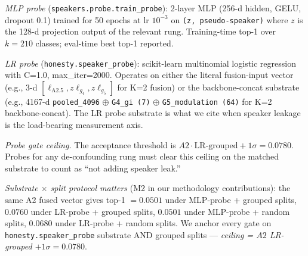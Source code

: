 \textit{MLP probe} (\texttt{speakers.probe.train\_probe}): 2-layer MLP (256-d hidden, GELU, dropout 0.1) trained for 50 epochs at lr $10^{-3}$ on \texttt{(z, pseudo-speaker)} where $z$ is the 128-d projection output of the relevant rung. Training-time top-1 over $k{=}210$ classes; eval-time best top-1 reported.

\textit{LR probe} (\texttt{honesty.speaker\_probe}): scikit-learn multinomial logistic regression with C=1.0, max\_iter=2000. Operates on either the literal fusion-input vector (e.g., 3-d $[\ell_{\text{A2.5}}, z\ell_{g_4}, z\ell_{g_5}]$ for K=2 fusion) or the backbone-concat substrate (e.g., 4167-d \texttt{pooled\_4096} $\oplus$ \texttt{G4\_gi (7)} $\oplus$ \texttt{G5\_modulation (64)} for K=2 backbone-concat). The LR probe substrate is what we cite when speaker leakage is the load-bearing measurement axis.

\textit{Probe gate ceiling.} The acceptance threshold is $A2 \cdot \mathrm{LR\text{-}grouped} + 1\sigma = 0.0780$. Probes for any de-confounding rung must clear this ceiling on the matched substrate to count as ``not adding speaker leak.''

\textit{Substrate $\times$ split protocol matters} (M2 in our methodology contributions): the same A2 fused vector gives top-1 $= 0.0501$ under MLP-probe + grouped splits, $0.0760$ under LR-probe + grouped splits, $0.0501$ under MLP-probe + random splits, $0.0680$ under LR-probe + random splits. We anchor every gate on \texttt{honesty.speaker\_probe} substrate AND grouped splits — \emph{ceiling = $A2$ LR-grouped $+ 1\sigma = 0.0780$}.
